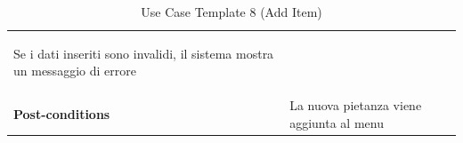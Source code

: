 \documentclass{article}
\begin{document}
\begin{table}
\begin{tabularx}{\textwidth}{|lX|}
\begin{description}[nosep,before=\leavevmode\vspace*{-1\baselineskip},after=\leavevmode\vspace*{-1\baselineskip}]
                                                                        \item [4a.] Se i dati inseriti sono invalidi, il sistema mostra un messaggio di errore
                                                                    \end{description} \\
                    \rowcolor{white} \textbf{Post-conditions} & La nuova pietanza viene aggiunta al menu \\
                    \toprule
                \end{tabularx}
                \caption{Use Case Template 8 (Add Item)}
                \label{tab:use-case-template-8}
            \end{table}
\end{document}

